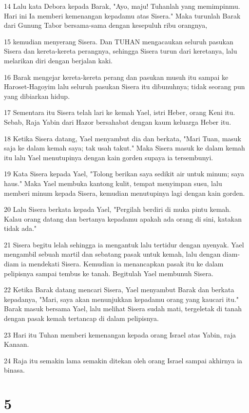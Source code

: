 \par 14 Lalu kata Debora kepada Barak, "Ayo, maju! Tuhanlah yang memimpinmu. Hari ini Ia memberi kemenangan kepadamu atas Sisera." Maka turunlah Barak dari Gunung Tabor bersama-sama dengan kesepuluh ribu orangnya,
\par 15 kemudian menyerang Sisera. Dan TUHAN mengacaukan seluruh pasukan Sisera dan kereta-kereta perangnya, sehingga Sisera turun dari keretanya, lalu melarikan diri dengan berjalan kaki.
\par 16 Barak mengejar kereta-kereta perang dan pasukan musuh itu sampai ke Haroset-Hagoyim lalu seluruh pasukan Sisera itu dibunuhnya; tidak seorang pun yang dibiarkan hidup.
\par 17 Sementara itu Sisera telah lari ke kemah Yael, istri Heber, orang Keni itu. Sebab, Raja Yabin dari Hazor bersahabat dengan kaum keluarga Heber itu.
\par 18 Ketika Sisera datang, Yael menyambut dia dan berkata, "Mari Tuan, masuk saja ke dalam kemah saya; tak usah takut." Maka Sisera masuk ke dalam kemah itu lalu Yael menutupinya dengan kain gorden supaya ia tersembunyi.
\par 19 Kata Sisera kepada Yael, "Tolong berikan saya sedikit air untuk minum; saya haus." Maka Yael membuka kantong kulit, tempat menyimpan susu, lalu memberi minum kepada Sisera, kemudian menutupinya lagi dengan kain gorden.
\par 20 Lalu Sisera berkata kepada Yael, "Pergilah berdiri di muka pintu kemah. Kalau orang datang dan bertanya kepadamu apakah ada orang di sini, katakan tidak ada."
\par 21 Sisera begitu lelah sehingga ia mengantuk lalu tertidur dengan nyenyak. Yael mengambil sebuah martil dan sebatang pasak untuk kemah, lalu dengan diam-diam ia mendekati Sisera. Kemudian ia menancapkan pasak itu ke dalam pelipisnya sampai tembus ke tanah. Begitulah Yael membunuh Sisera.
\par 22 Ketika Barak datang mencari Sisera, Yael menyambut Barak dan berkata kepadanya, "Mari, saya akan menunjukkan kepadamu orang yang kaucari itu." Barak masuk bersama Yael, lalu melihat Sisera sudah mati, tergeletak di tanah dengan pasak kemah tertancap di dalam pelipisnya.
\par 23 Hari itu Tuhan memberi kemenangan kepada orang Israel atas Yabin, raja Kanaan.
\par 24 Raja itu semakin lama semakin ditekan oleh orang Israel sampai akhirnya ia binasa.

\chapter{5}

